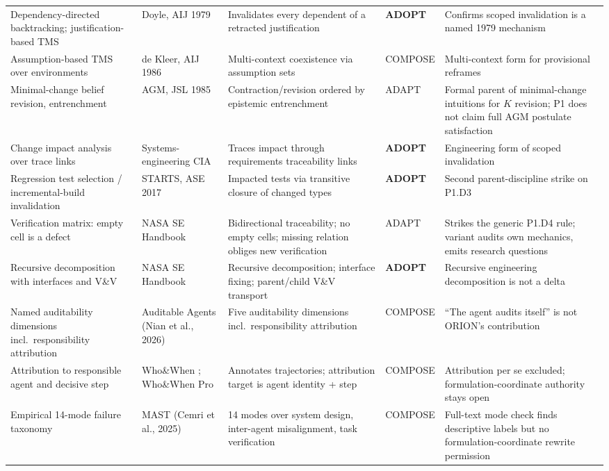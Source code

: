 {\begin{longtable}{N{0.60in}N{1.05in}N{1.70in}N{0.60in}N{2.20in}}
  Dependency-directed backtracking; justification-based TMS & Doyle, AIJ 1979 \cite{doyle1979} & Invalidates every dependent of a retracted justification & \textbf{ADOPT} & Confirms scoped invalidation is a named 1979 mechanism \\
  Assumption-based TMS over environments & de Kleer, AIJ 1986 \cite{dekleer1986} & Multi-context coexistence via assumption sets & COMPOSE & Multi-context form for provisional reframes \\
  Minimal-change belief revision, entrenchment & AGM, JSL 1985 \cite{agm1985} & Contraction/revision ordered by epistemic entrenchment & ADAPT & Formal parent of minimal-change intuitions for $K$ revision; P1 does not claim full AGM postulate satisfaction \\
  Change impact analysis over trace links & Systems-engineering CIA & Traces impact through requirements traceability links & \textbf{ADOPT} & Engineering form of scoped invalidation \\
  Regression test selection / incremental-build invalidation & STARTS, ASE 2017 & Impacted tests via transitive closure of changed types & \textbf{ADOPT} & Second parent-discipline strike on P1.D3 \\
  Verification matrix: empty cell is a defect & NASA SE Handbook \cite{nasa2016} & Bidirectional traceability; no empty cells; missing relation obliges new verification & ADAPT & Strikes the generic P1.D4 rule; variant audits own mechanics, emits research questions \\
  Recursive decomposition with interfaces and V\&V & NASA SE Handbook \cite{nasa2016} & Recursive decomposition; interface fixing; parent/child V\&V transport & \textbf{ADOPT} & Recursive engineering decomposition is not a delta \\
  Named auditability dimensions incl.\ responsibility attribution & Auditable Agents \cite{auditable2026} (Nian et al., 2026) & Five auditability dimensions incl.\ responsibility attribution & COMPOSE & ``The agent audits itself'' is not ORION's contribution \\
  Attribution to responsible agent and decisive step & Who\&When \cite{whowhen2025}; Who\&When Pro \cite{whowhenpro2026} & Annotates trajectories; attribution target is agent identity + step & COMPOSE & Attribution per se excluded; formulation-coordinate authority stays open \\
  Empirical 14-mode failure taxonomy & MAST \cite{mast2025} (Cemri et al., 2025) & 14 modes over system design, inter-agent misalignment, task verification & COMPOSE & Full-text mode check finds descriptive labels but no formulation-coordinate rewrite permission \\

\end{longtable}}
